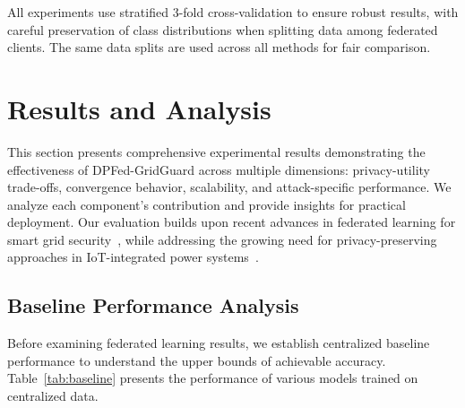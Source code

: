 \documentclass{ieeeaccess}
\theoremstyle{definition}
\begin{document}
All experiments use stratified 3-fold cross-validation to ensure robust results, with careful preservation of class distributions when splitting data among federated clients. The same data splits are used across all methods for fair comparison.

\section{Results and Analysis}
\label{sec:results}

This section presents comprehensive experimental results demonstrating the effectiveness of DPFed-GridGuard across multiple dimensions: privacy-utility trade-offs, convergence behavior, scalability, and attack-specific performance. We analyze each component's contribution and provide insights for practical deployment. Our evaluation builds upon recent advances in federated learning for smart grid security~\cite{husnoo2024decentralized,li2025clustered}, while addressing the growing need for privacy-preserving approaches in IoT-integrated power systems~\cite{ali2025privacy}.

\subsection{Baseline Performance Analysis}

Before examining federated learning results, we establish centralized baseline performance to understand the upper bounds of achievable accuracy. Table~\ref{tab:baseline} presents the performance of various models trained on centralized data.
\end{document}
